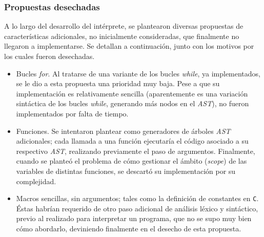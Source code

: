 \documentclass[12pt]{article}
\begin{document}
\subsubsection{Propuestas desechadas}
A lo largo del desarrollo del intérprete, se plantearon diversas propuestas de características adicionales, no inicialmente consideradas, que finalmente no llegaron a implementarse. Se detallan a continuación, junto con los motivos por los cuales fueron desechadas.
\begin{itemize}
    \item Bucles \textit{for}. Al tratarse de una variante de los bucles \textit{while}, ya implementados, se le dio a esta propuesta una prioridad muy baja. Pese a que su implementación es relativamente sencilla (aparentemente es una variación sintáctica de los bucles \textit{while}, generando más nodos en el \textit{AST}), no fueron implementados por falta de tiempo.
    \item Funciones. Se intentaron plantear como generadores de árboles \textit{AST} adicionales; cada llamada a una función ejecutaría el código asociado a su respectivo \textit{AST}, realizando previamente el paso de argumentos. Finalmente, cuando se planteó el problema de cómo gestionar el ámbito (\textit{scope}) de las variables de distintas funciones, se descartó su implementación por su complejidad.
    \item Macros sencillas, sin argumentos; tales como la definición de constantes en \texttt{C}. Éstas habrían requerido de otro paso adicional de análisis léxico y sintáctico, previo al realizado para interpretar un programa, que no se supo muy bien cómo abordarlo, deviniendo finalmente en el desecho de esta propuesta.
\end{itemize}\par
 
\end{document}
